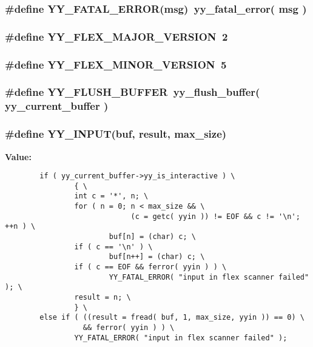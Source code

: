 \subsubsection{\setlength{\rightskip}{0pt plus 5cm}\#define YY\_\-FATAL\_\-ERROR(msg)\ yy\_\-fatal\_\-error( msg )}\label{lexer_8c_a76}


\subsubsection{\setlength{\rightskip}{0pt plus 5cm}\#define YY\_\-FLEX\_\-MAJOR\_\-VERSION\ 2}\label{lexer_8c_a18}


\subsubsection{\setlength{\rightskip}{0pt plus 5cm}\#define YY\_\-FLEX\_\-MINOR\_\-VERSION\ 5}\label{lexer_8c_a19}


\subsubsection{\setlength{\rightskip}{0pt plus 5cm}\#define YY\_\-FLUSH\_\-BUFFER\ yy\_\-flush\_\-buffer( yy\_\-current\_\-buffer )}\label{lexer_8c_a40}


\subsubsection{\setlength{\rightskip}{0pt plus 5cm}\#define YY\_\-INPUT(buf, result, max\_\-size)}\label{lexer_8c_a73}


{\bf Value:}\footnotesize\begin{verbatim}        if ( yy_current_buffer->yy_is_interactive ) \
                { \
                int c = '*', n; \
                for ( n = 0; n < max_size && \
                             (c = getc( yyin )) != EOF && c != '\n'; ++n ) \
                        buf[n] = (char) c; \
                if ( c == '\n' ) \
                        buf[n++] = (char) c; \
                if ( c == EOF && ferror( yyin ) ) \
                        YY_FATAL_ERROR( "input in flex scanner failed" ); \
                result = n; \
                } \
        else if ( ((result = fread( buf, 1, max_size, yyin )) == 0) \
                  && ferror( yyin ) ) \
                YY_FATAL_ERROR( "input in flex scanner failed" );
\end{verbatim}\normalsize 
{}

